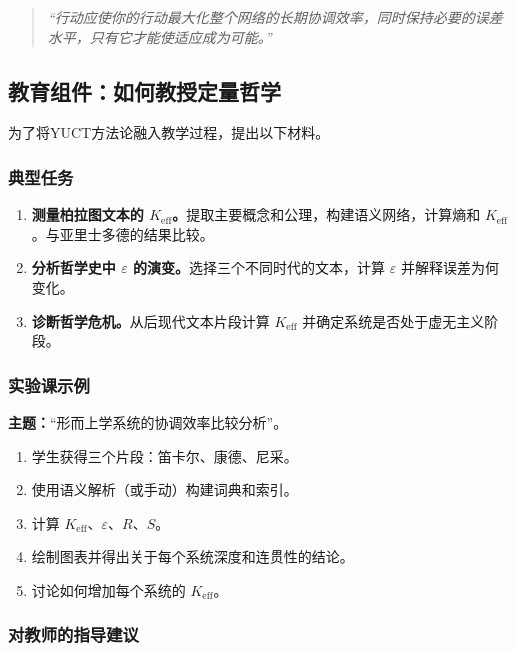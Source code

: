 \documentclass[11pt,a4paper]{article}
\newcommand{\eps}{\varepsilon}
\begin{document}
	\begin{quote}
		\textit{“行动应使你的行动最大化整个网络的长期协调效率，同时保持必要的误差水平，只有它才能使适应成为可能。”}
	\end{quote}
	
	\subsection{教育组件：如何教授定量哲学}
	\label{sec:educational}
	
	为了将YUCT方法论融入教学过程，提出以下材料。
	
	\subsubsection{典型任务}
	
	\begin{enumerate}[label=(\arabic*)]
		\item \textbf{测量柏拉图文本的 \(K_{\mathrm{eff}}\)。}提取主要概念和公理，构建语义网络，计算熵和 \(K_{\mathrm{eff}}\)。与亚里士多德的结果比较。
		\item \textbf{分析哲学史中 \(\eps\) 的演变。}选择三个不同时代的文本，计算 \(\eps\) 并解释误差为何变化。
		\item \textbf{诊断哲学危机。}从后现代文本片段计算 \(K_{\mathrm{eff}}\) 并确定系统是否处于虚无主义阶段。
	\end{enumerate}
	
	\subsubsection{实验课示例}
	
	\textbf{主题：}“形而上学系统的协调效率比较分析”。
	
	\begin{enumerate}
		\item 学生获得三个片段：笛卡尔、康德、尼采。
		\item 使用语义解析（或手动）构建词典和索引。
		\item 计算 \(K_{\mathrm{eff}}\)、\(\eps\)、\(R\)、\(S\)。
		\item 绘制图表并得出关于每个系统深度和连贯性的结论。
		\item 讨论如何增加每个系统的 \(K_{\mathrm{eff}}\)。
	\end{enumerate}
	
	\subsubsection{对教师的指导建议}
	
\end{document}
